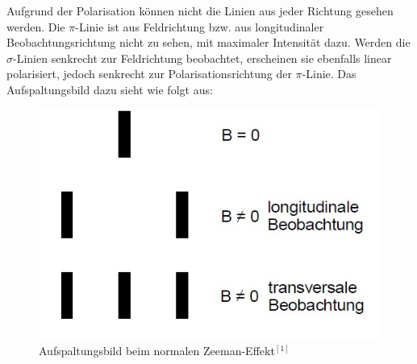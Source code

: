 \documentclass{article}
\begin{document}
	Aufgrund der Polarisation können nicht die Linien aus jeder Richtung gesehen werden. Die $\pi$-Linie ist aus Feldrichtung bzw. aus longitudinaler Beobachtungsrichtung nicht zu sehen, mit maximaler Intensität dazu. Werden die $\sigma$-Linien senkrecht zur Feldrichtung beobachtet, erscheinen sie ebenfalls linear polarisiert, jedoch senkrecht zur Polarisationsrichtung der $\pi$-Linie. Das Aufspaltungsbild dazu sieht wie folgt aus:
	\begin{figure}[h!]
		\centering
		\includegraphics[width=0.7\linewidth]{Aufspaltungsbild.jpg}
		\caption{Aufspaltungsbild beim normalen Zeeman-Effekt$^{[1]}$}
		\label{fig:aufspaltungsbild}
	\end{figure}
\end{document}
